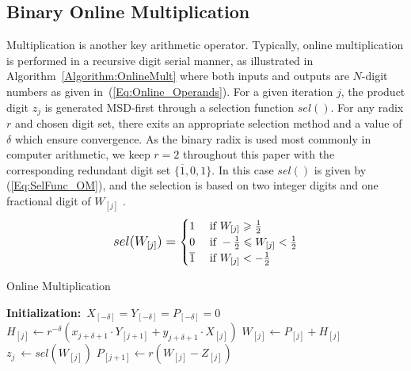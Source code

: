 \documentclass[conference]{IEEEtran}
\begin{document}
\subsection{Binary Online Multiplication}
Multiplication is another key arithmetic operator. Typically, online multiplication is performed in a recursive digit serial manner, as illustrated in Algorithm~\ref{Algorithm:OnlineMult} \cite{Ercegovac_OnlineMult} where both inputs and outputs are $N$-digit numbers as given in~(\ref{Eq:Online_Operands}). For a given iteration $j$, the product digit $z_j$ is generated MSD-first through a selection function $sel()$. For any radix $r$ and chosen digit set, there exits an appropriate selection method and a value of $\delta$ which ensure convergence. As the binary radix is used most commonly in computer arithmetic, we keep $r=2$ throughout this paper with the corresponding redundant digit set $\{\overline{1},0,1\}$. In this case $sel()$ is given by (\ref{Eq:SelFunc_OM}), and the selection is based on two integer digits and one fractional digit of $W_{[j]}$ \cite{Ercegovac_OnlineMult}.
%
\begin{eqnarray}\label{Eq:SelFunc_OM}
\small
  sel(W_{[j]})=\begin{cases}
    1 & \text{ if } W_{[j]} \geqslant \frac{1}{2} \\
    0 & \text{ if } -\frac{1}{2}\leqslant W_{[j]}<\frac{1}{2} \\
    \overline{1} & \text{ if } W_{[j]}<-\frac{1}{2}
  \end{cases}
\normalsize
\end{eqnarray}

\begin{algorithm}[tbp]
  \caption{Online Multiplication}  \label{Algorithm:OnlineMult}
  \begin{algorithmic}[1]
   \State \textbf{Initialization:}~$X_{[-\delta]}=Y_{[-\delta]}=P_{[-\delta]}=0$\vspace{.5ex}
    \vspace{.5ex}
        \State $H_{[j]} \leftarrow r^{-\delta}\left(x_{j+\delta+1}\cdot Y_{[j+1]}+y_{j+\delta+1}\cdot X_{[j]}\right)$\vspace{.5ex}
        \State $W_{[j]} \leftarrow P_{[j]} + H_{[j]}$\vspace{.5ex}
        \State $z_{j}~ \leftarrow sel(W_{[j]})$\vspace{.5ex}
        \State $P_{[j+1]} \leftarrow r\left(W_{[j]}-Z_{[j]}\right)$\vspace{.5ex}
    \EndFor
  \end{algorithmic}
\end{algorithm}
\vspace{-1ex}
\end{document}

